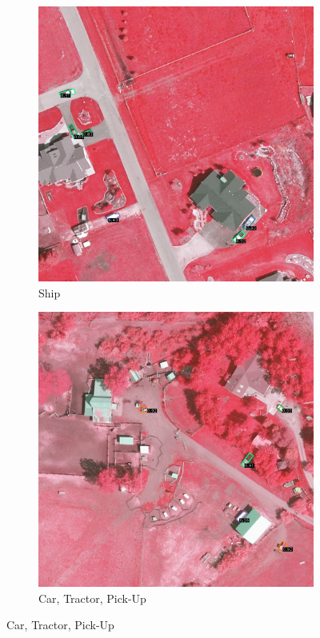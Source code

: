 \begin{figure}[h!]
    \begin{subfigure}[t]{0.38\textwidth}
        \centering
        \includegraphics[width=\linewidth]{images/015Results/02perm_exp/comp_images/irgb/509.png}
        \caption{Ship}
    \end{subfigure}
    \begin{subfigure}[t]{0.38\textwidth}
        \centering
        \includegraphics[width=\linewidth]{images/015Results/02perm_exp/comp_images/irgb/523.png}
        \caption{Car, Tractor, Pick-Up}
    \end{subfigure}
    

\end{figure}
